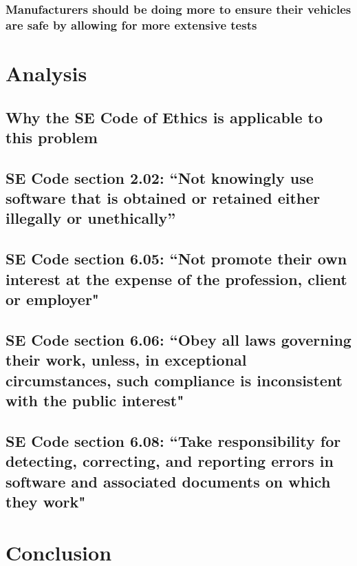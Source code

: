 \documentclass[12pt]{article}
\begin{document}
\begin{multicols}{2}
\subsubsection{Manufacturers should be doing more to ensure their vehicles are safe by allowing for more extensive tests}

\section{Analysis}

\subsection{Why the SE Code of Ethics is applicable to this problem}

\subsection{SE Code section 2.02: ``Not knowingly use software that is obtained or retained either illegally or unethically''}

\subsection {SE Code section 6.05: ``Not promote their own interest at the expense of the profession, client or employer"}

\subsection{SE Code section 6.06: ``Obey all laws governing their work, unless, in exceptional circumstances, such compliance is inconsistent with the public interest"}

\subsection{SE Code section 6.08: ``Take responsibility for detecting, correcting, and reporting errors in software and associated documents on which they work"}

\section{Conclusion}

\end{multicols}

\nocite{*}



\newpage

\end{document}
